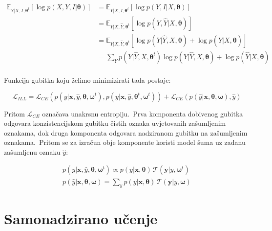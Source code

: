 \documentclass[diplomskirad]{fer}
\begin{document}
\begin{equation}
  \begin{aligned}
    \mathbb{E}_{Y | X, I, \bm{\theta}^t} \left[ \log p(X, Y, I | \bm{\theta}) \right] &= \mathbb{E}_{Y | X, I, \bm{\theta}^t} \left[ \log p(Y, I | X, \bm{\theta}) \right] \\
    &= \mathbb{E}_{Y | X, \hat{Y}, \bm{\theta}^t} \left[ \log p(Y, \hat{Y} | X, \bm{\theta}) \right] \\
    &= \mathbb{E}_{Y | X, \hat{Y}, \bm{\theta}^t} \left[ \log p(Y | \hat{Y}, X, \bm{\theta}) + \log p(\hat{Y} | X, \bm{\theta}) \right] \\
    &= \sum_{Y} p(Y | \hat{Y}, X, \bm{\theta}^t) \log p(Y | \hat{Y}, X, \bm{\theta}) + \log p(\hat{Y} | X, \bm{\theta}) \\
  \end{aligned}
  \label{eq:ill_target}
\end{equation}

Funkcija gubitka koju želimo minimizirati tada postaje:

\begin{equation}
  \mathcal{L}_{ILL} = \mathcal{L}_{CE} (p(y | \bm{x}, \hat{y}, \bm{\theta}, \bm{\omega}^t), p(y | \bm{x}, \hat{y}, \bm{\theta}^t, \bm{\omega}^t)) + \mathcal{L}_{CE} (p(\hat{y} | \bm{x}, \bm{\theta}, \bm{\omega}), \hat{y})
  \label{eq:ill_loss}
\end{equation}

Pritom $\mathcal{L}_{CE}$ označava unakrsnu entropiju.\ Prva komponenta dobivenog gubitka odgovara konzistencijskom gubitku čistih oznaka uvjetovanih zašumljenim oznakama, dok druga komponenta odgovara nadziranom gubitku na zašumljenim oznakama.\ 
Pritom se za izračun obje komponente koristi model šuma uz zadanu zašumljenu oznaku $\hat{y}$:

\begin{equation}
  \begin{aligned}
    p(y | \bm{x}, \hat{y}, \bm{\theta}, \bm{\omega}^t) \propto p(y | \bm{x}, \bm{\theta}) \, \mathcal{T}(\bm{y} | y, \bm{\omega}^t) \\
    p(\hat{y} | \bm{x}, \bm{\theta}, \bm{\omega}) = \sum_{y} p(y | \bm{x}, \bm{\theta}) \, \mathcal{T}(\bm{y} | y, \bm{\omega})
  \end{aligned}
  \label{eq:ill_probs}
\end{equation}

\chapter{Samonadzirano učenje}
\label{pog:samonadzirano}
\end{document}
